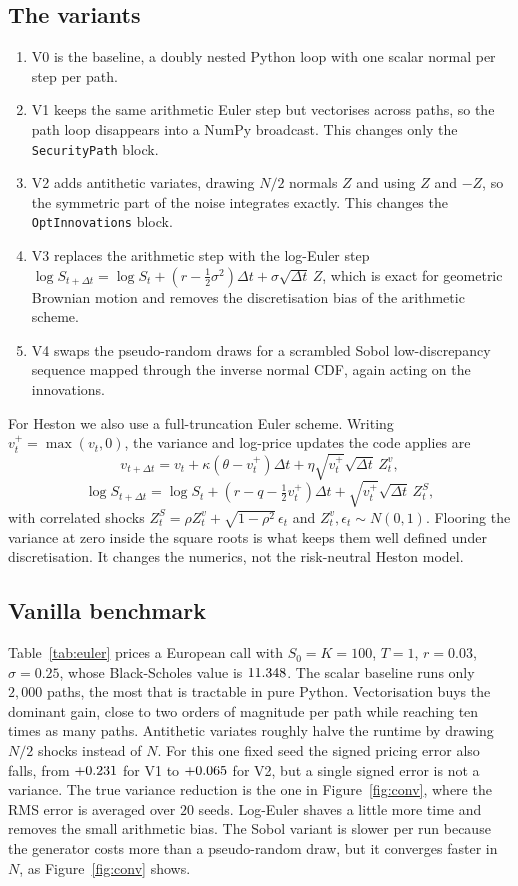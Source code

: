 \documentclass[12pt,a4paper]{article}
\begin{document}
\subsection{The variants}
\begin{enumerate}[label=\roman*., itemsep=1pt]
  \item V0 is the baseline, a doubly nested Python loop with one
  scalar normal per step per path.
  \item V1 keeps the same arithmetic Euler step but vectorises across
  paths, so the path loop disappears into a NumPy broadcast. This changes only
  the \texttt{SecurityPath} block.
  \item V2 adds antithetic variates, drawing $N/2$ normals $Z$ and
  using $Z$ and $-Z$, so the symmetric part of the noise integrates exactly.
  This changes the \texttt{OptInnovations} block.
  \item V3 replaces the arithmetic step with the log-Euler step
  $\log S_{t+\Delta t}=\log S_t+(r-\tfrac12\sigma^2)\Delta t+\sigma\sqrt{\Delta t}\,Z$,
  which is exact for geometric Brownian motion and removes the discretisation
  bias of the arithmetic scheme.
  \item V4 swaps the pseudo-random draws for a scrambled Sobol
  low-discrepancy sequence mapped through the inverse normal CDF, again acting on
  the innovations.
\end{enumerate}
For Heston we also use a full-truncation Euler scheme. Writing
$v_t^+=\max(v_t,0)$, the variance and log-price updates the code applies are
\[
v_{t+\Delta t}=v_t+\kappa(\theta-v_t^+)\Delta t
  +\eta\sqrt{v_t^+}\sqrt{\Delta t}\,Z^v_t,
\]
\[
\log S_{t+\Delta t}=\log S_t+\left(r-q-\tfrac12 v_t^+\right)\Delta t
  +\sqrt{v_t^+}\sqrt{\Delta t}\,Z^S_t,
\]
with correlated shocks $Z^S_t=\rho Z^v_t+\sqrt{1-\rho^2}\,\epsilon_t$ and
$Z^v_t,\epsilon_t\sim N(0,1)$. Flooring the variance at zero inside the square
roots is what keeps them well defined under discretisation. It changes the
numerics, not the risk-neutral Heston model.

\subsection{Vanilla benchmark}
Table~\ref{tab:euler} prices a European call with $S_0=K=100$, $T=1$, $r=0.03$,
$\sigma=0.25$, whose Black-Scholes value is $11.348$. The scalar baseline runs
only $2{,}000$ paths, the most that is tractable in pure Python. Vectorisation
buys the dominant gain, close to two orders of magnitude per path while reaching
ten times as many paths. Antithetic variates roughly halve the runtime by
drawing $N/2$ shocks instead of $N$. For this one fixed seed the signed pricing
error also falls, from $+0.231$ for V1 to $+0.065$ for V2, but a
single signed
error is not a variance. The true variance reduction is the one in
Figure~\ref{fig:conv}, where the RMS error is averaged over $20$ seeds. Log-Euler
shaves a little more time and removes the small arithmetic bias. The Sobol variant is slower per run because the generator costs more than a
pseudo-random draw, but it converges faster in $N$, as Figure~\ref{fig:conv}
shows.
\end{document}
